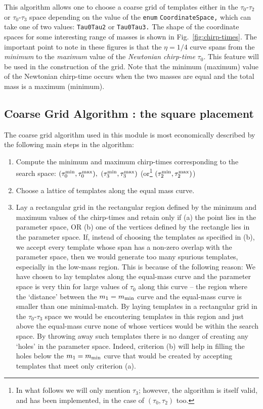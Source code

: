 This algorithm allows one to choose
a coarse grid of templates either in the $\tau_0$-$\tau_2$
or $\tau_0$-$\tau_3$ space depending on the value of the
\texttt {enum}
\texttt {CoordinateSpace,} which can take one of two values:
\texttt {Tau0Tau2} or \texttt {Tau0Tau3.} The shape of the coordinate
spaces for some interesting range of masses is shown
in Fig.~\ref{fig:chirp-times}. The important point to note in these
figures is that the $\eta=1/4$ curve spans from the {\it minimum} to the
{\it maximum} value of the {\it Newtonian chirp-time} $\tau_0.$  This
feature will be used in the construction of the grid. Note that
the minimum (maximum) value of the Newtonian chirp-time occurs when
the two masses are equal and the total mass is a maximum (minimum).

\subsection{Coarse Grid Algorithm : the square placement}

The coarse grid algorithm used in this module is most economically
described by the following main steps in the algorithm:
\begin{enumerate}
\item Compute the minimum and maximum chirp-times corresponding to the
search space: $(\tau_0^{\rm min}, \tau_0^{\rm max}),$
$(\tau_3^{\rm min}, \tau_3^{\rm max})$ (or\footnote{In what follows
we will only mention $\tau_3$; however, the algorithm is itself valid,
and has been implemented, in the case of $(\tau_0,\tau_2)$ too.}
$(\tau_2^{\rm min}, \tau_2^{\rm max})$)

 \item Choose a lattice of templates along the equal mass curve.

\item Lay a rectangular grid in the rectangular region defined by
the minimum and maximum values of the chirp-times and retain only
if (a) the point lies in the parameter space, OR (b) one of the
vertices defined by the rectangle lies in the parameter space.
If, instead of choosing the templates as specified in (b), we accept
every template whose span has a non-zero overlap with the parameter
space, then we
would generate too many spurious templates, especially in the low-mass
region. This is because of the following reason:
We have chosen to lay templates along the
equal-mass curve and the parameter space is very thin for large values
of $\tau_0$ along this curve -- the region where the `distance'
between the $m_1=m_{\rm min}$ curve and the equal-mass curve is
smaller than one minimal-match.
By laying templates in a rectangular grid in the
$\tau_0$-$\tau_3$ space we would be encoutering templates in this
region and just above the equal-mass curve
none of whose vertices would be within the search space. By
throwing away such templates there is no danger of creating any
`holes' in the parameter space. Indeed, criterion (b)
will help in filling the holes below the $m_1=m_{\rm min}$
curve that would be created by accepting templates that meet
only criterion (a).

\end{enumerate}

